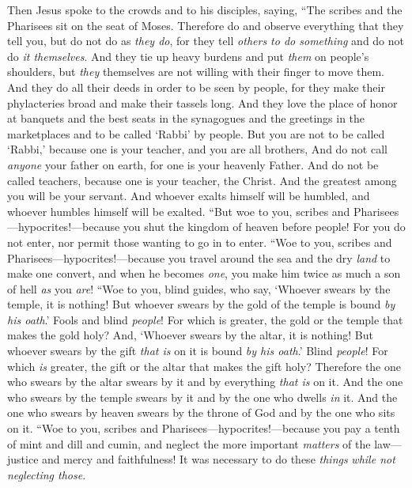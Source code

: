 \begin{biblechapter} %
 Then Jesus spoke to the crowds and to his disciples,
\verse saying, “The scribes and the Pharisees sit on the seat of Moses.
\verse Therefore do and observe everything that they tell you, but do not do as \textit{they do}, for they tell \textit{others to do something} and do not do \textit{it themselves}.
\verse And they tie up heavy burdens and put \textit{them} on people’s shoulders, but \textit{they} themselves are not willing with their finger to move them.
\verse And they do all their deeds in order to be seen by people, for they make their phylacteries broad and make their tassels long.
\verse And they love the place of honor at banquets and the best seats in the synagogues
\verse and the greetings in the marketplaces and to be called ‘Rabbi’ by people.
\verse But you are not to be called ‘Rabbi,’ because one is your teacher, and you are all brothers,
\verse And do not call \textit{anyone} your father on earth, for one is your heavenly Father.
\verse And do not be called teachers, because one is your teacher, the Christ.
\verse And the greatest among you will be your servant.
\verse And whoever exalts himself will be humbled, and whoever humbles himself will be exalted.
\verse “But woe to you, scribes and Pharisees—hypocrites!—because you shut the kingdom of heaven before people! For you do not enter, nor permit those wanting to go in to enter.
\verse “Woe to you, scribes and Pharisees—hypocrites!—because you travel around the sea and the dry \textit{land} to make one convert, and when he becomes \textit{one}, you make him twice as much a son of hell \textit{as} you \textit{are}!
\verse “Woe to you, blind guides, who say, ‘Whoever swears by the temple, it is nothing! But whoever swears by the gold of the temple is bound \textit{by his oath}.’
\verse Fools and blind \textit{people}! For which is greater, the gold or the temple that makes the gold holy?
\verse And, ‘Whoever swears by the altar, it is nothing! But whoever swears by the gift \textit{that is} on it is bound \textit{by his oath}.’
\verse Blind \textit{people}! For which \textit{is} greater, the gift or the altar that makes the gift holy?
\verse Therefore the one who swears by the altar swears by it and by everything \textit{that is} on it.
\verse And the one who swears by the temple swears by it and by the one who dwells \textit{in} it.
\verse And the one who swears by heaven swears by the throne of God and by the one who sits on it.
\verse “Woe to you, scribes and Pharisees—hypocrites!—because you pay a tenth of mint and dill and cumin, and neglect the more important \textit{matters} of the law—justice and mercy and faithfulness! It was necessary to do these \textit{things} \textit{while not neglecting those}.

\end{biblechapter}
